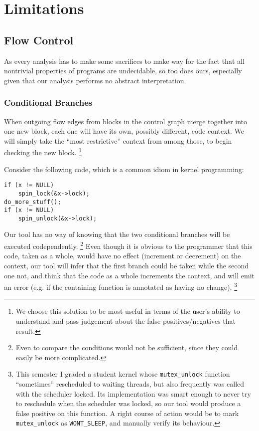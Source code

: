 \documentclass{article}
\begin{document}

\section{Limitations}

\subsection{Flow Control}

As every analysis has to make some sacrifices to make way for the fact that all nontrivial properties of programs are undecidable, so too does ours, especially given that our analysis performs no abstract interpretation.

\subsubsection{Conditional Branches}

When outgoing flow edges from blocks in the control graph merge together into one new block, each one will have its own, possibly different, code context. We will simply take the ``most restrictive'' context from among those, to begin checking the new block.
\footnote{We choose this solution to be most useful in terms of the user's ability to understand and pass judgement about the false positives/negatives that result.}

Consider the following code, which is a common idiom in kernel programming:

\begin{verbatim}
if (x != NULL)
    spin_lock(&x->lock);
do_more_stuff();
if (x != NULL)
    spin_unlock(&x->lock);
\end{verbatim}

Our tool has no way of knowing that the two conditional branches will be executed codependently.
\footnote{Even to compare the conditions would not be sufficient, since they could easily be more complicated.}
Even though it is obvious to the programmer that this code, taken as a whole, would have no effect (increment or decrement) on the context, our tool will infer that the first branch could be taken while the second one not, and think that the code as a whole increments the context, and will emit an error (e.g. if the containing function is annotated as having no change).
\footnote{This semester I graded a student kernel whose \texttt{mutex\_unlock} function ``sometimes'' rescheduled to waiting threads, but also frequently was called with the scheduler locked. Its implementation was smart enough to never try to reschedule when the scheduler was locked, so our tool would produce a false positive on this function. A right course of action would be to mark \texttt{mutex\_unlock} as \texttt{WONT\_SLEEP}, and manually verify its behaviour.}
\end{document}
